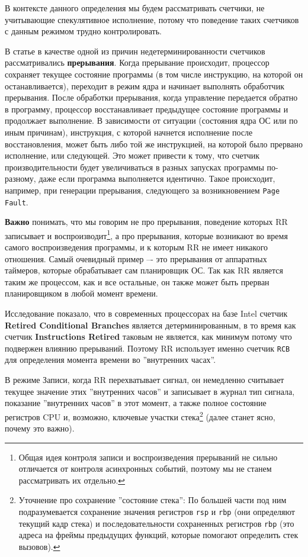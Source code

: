 В контексте данного определения мы будем рассматривать счетчики, не учитывающие
спекулятивное исполнение, потому что поведение таких счетчиков с данным режимом трудно
контролировать.

В статье \cite{inproceedings} в качестве одной из причин недетерминированности
счетчиков рассматривались \textbf{прерывания}. Когда прерывание происходит,
процессор сохраняет текущее состояние программы (в том числе инструкцию, на
которой он останавливается), переходит в режим ядра и начинает выполнять
обработчик прерывания. После обработки прерывания, когда управление передается
обратно в программу, процессор восстанавливает предыдущее состояние программы и
продолжает выполнение. В зависимости от ситуации (состояния ядра ОС или по иным
причинам), инструкция, с которой начнется исполнение после восстановления,
может быть либо той же инструкцией, на которой было прервано исполнение, или
следующей. Это может привести к тому, что счетчик производительности будет
увеличиваться в разных запусках программы по-разному, даже если программа
выполняется идентично. Такое происходит, например, при генерации прерывания,
следующего за возникновением \texttt{Page Fault}.

\textbf{Важно} понимать, что мы говорим не про прерывания, поведение которых RR
записывает и воспроизводит\footnote{Общая идея контроля записи и
воспроизведения прерываний не сильно отличается от контроля асинхронных событий, поэтому
мы не станем рассматривать их отдельно.}, а про прерывания, которые возникают во
время самого воспроизведения программы, и к которым RR не имеет никакого
отношения. Самый очевидный пример –- это прерывания от аппаратных таймеров,
которые обрабатывает сам планировщик ОС. Так как RR является таким же
процессом, как и все остальные, он также может быть прерван планировщиком в
любой момент времени.

Исследование \cite{inproceedings} показало, что в современных процессорах на
базе Intel счетчик \textbf{Retired Conditional Branches} является
детерминированным, в то время как счетчик \textbf{Instructions Retired} таковым
не является, как минимум потому что подвержен влиянию прерываний. Поэтому RR
использует именно счетчик \texttt{RCB} для определения момента времени во ''внутренних часах''.

В режиме Записи, когда RR перехватывает сигнал, он немедленно считывает текущее
значение этих ''внутренних часов'' и записывает в журнал тип сигнала, показание
''внутренних часов'' в этот момент, а также полное состояние регистров CPU и,
возможно, ключевые участки стека\footnote{Уточнение про сохранение ''состояние
стека'': По большей части под ним подразумевается сохранение значения регистров
\texttt{rsp} и \texttt{rbp} (они определяют текущий кадр стека) и
последовательности сохраненных регистров \texttt{rbp} (это адреса на фреймы
предыдущих функций, которые помогают определить стек вызовов).} (далее станет
ясно, почему это важно).

